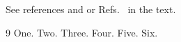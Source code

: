 \documentclass{article}
\begin{document}
See references  and  or Refs.~ in the text.

\begin{thebibliography}{9}
 One.
 Two.
 Three.
 Four.
 Five.
 Six.
\end{thebibliography}
\end{document}
